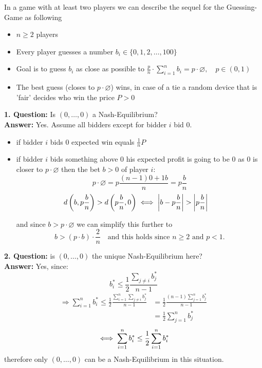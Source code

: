 
\begin{example} 
	In a game with at least two players we can describe the sequel for the Guessing-Game as following
	\begin{itemize}
		\item $n \geq 2$ players
		\item Every player guesses a number $b_{i} \in \{0, 1, 2, \dotsc, 100 \}$
		\item Goal is to guess $b_{i}$ as close as possible to $\frac{p}{n} \cdot \sum_{i = 1}^{n} b_{i} = p \cdot \varnothing, \quad p \in (0, 1)$
		\item The best guess (closes to $p \cdot \varnothing$) wins, in case of a tie a random device that is 'fair' decides who win the price $P > 0$
	\end{itemize}
	
	
	\textbf{1. Question:} Is $(0, \dotsc, 0)$ a Nash-Equilibrium? \\
	\textbf{Answer:} Yes. Assume all bidders except for bidder $i$ bid $0$.	
		\begin{itemize}
			\item if bidder $i$ bids $0$ expected win equals $\frac{1}{n} P $
			\item if bidder $i$ bids something above $0$ his expected profit is going to be $0$ as $0$ is closer to $p \cdot \varnothing$ then the bet $b > 0$ of player $i$:
			\[ p \cdot \varnothing = p \frac{(n - 1)0 + 1 b}{n} = p \frac{b}{n} \]
			\[
				d \left( b, p \frac{b}{n} \right) > d \left( p \frac{b}{n}, 0 \right)	\iff \left| b - p \frac{b}{n} \right| > \left| p \frac{b}{n} \right| \quad
			\]
			
			and since $b > p \cdot \varnothing$ we can simplify this further to
			\[ b > \left( p \cdot b \right) \cdot \frac{2}{n} \quad \text{and this holds since } n \geq 2 \text{ and } p < 1.\]
		\end{itemize}
		
	
	\textbf{2. Question:} is $(0, \dotsc, 0)$ the unique Nash-Equilibrium here? \\
	\textbf{Answer:} Yes, since:	
	\[ b_{i}^{*} \leq \frac{1}{2} \frac{\sum_{j \neq i} b_{j}^{*}}{n - 1} \]
	\begin{align*}
		\Rightarrow \sum_{i = 1}^{n} b_{i}^{*} \leq \frac{1}{2} \frac{\sum_{i = 1}^{n} \sum_{j \neq i} b_{j}^{*}}{n - 1} & = \frac{1}{2} \frac{(n - 1) \sum_{j = 1}^{n} b_{j}^{*}}{n - 1} \\
		& = \frac{1}{2} \sum_{j = 1}^{n} b_{j}^{*}
	\end{align*} 
	\[ \iff \sum_{i = 1}^{n} b_{i}^{*} \leq \frac{1}{2} \sum_{i = 1}^{n} b_{i}^{*} \]
	therefore only $(0, \dotsc,  0)$ can be a Nash-Equilibrium in this situation. \\



\end{example}
